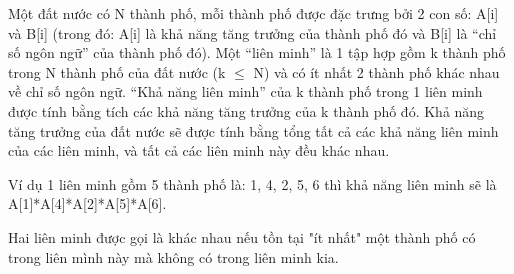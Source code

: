 Một đất nước có N thành phố, mỗi thành phố được đặc trưng bởi 2 con số: A[i] và B[i] (trong đó: A[i] là khả năng tăng trưởng của thành phố đó và B[i] là “chỉ số ngôn ngữ” của thành phố đó). Một “liên minh” là 1 tập hợp gồm k thành phố trong N thành phố của đất nước (k  $\le$  N) và có ít nhất 2 thành phố khác nhau về chỉ số ngôn ngữ. “Khả năng liên minh” của k thành phố trong 1 liên minh được tính bằng tích các khả năng tăng trưởng của k thành phố đó. Khả năng tăng trưởng của đất nước sẽ được tính bằng tổng tất cả các khả năng liên minh của các liên minh, và tất cả các liên minh này đều khác nhau.   



    Ví dụ 1 liên minh gồm 5 thành phố là: 1, 4, 2, 5, 6 thì khả năng liên minh sẽ là A[1]*A[4]*A[2]*A[5]*A[6].   



    Hai liên minh được gọi là khác nhau nếu tồn tại "ít nhất" một thành phố có trong liên mình này mà không có trong liên minh kia.   

\